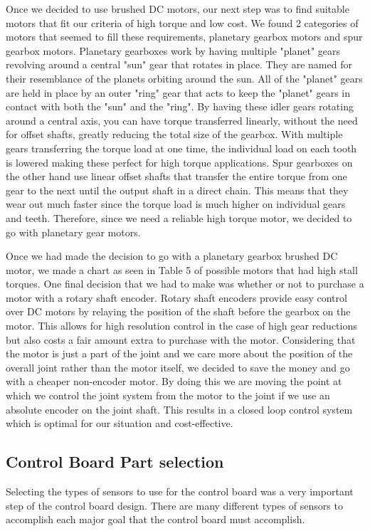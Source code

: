 \noindent Once we decided to use brushed DC motors, our next step was to find suitable motors that fit our criteria of high torque and low cost. We found 2 categories of motors that seemed to fill these requirements, planetary gearbox motors and spur gearbox motors. Planetary gearboxes work by having multiple "planet" gears revolving around a central "sun" gear that rotates in place. They are named for their resemblance of the planets orbiting around the sun. All of the "planet" gears are held in place by an outer "ring" gear that acts to keep the "planet" gears in contact with both the "sun" and the "ring". By having these idler gears rotating around a central axis, you can have torque transferred linearly, without the need for offset shafts, greatly reducing the total size of the gearbox. With multiple gears transferring the torque load at one time, the individual load on each tooth is lowered making these perfect for high torque applications. Spur gearboxes on the other hand use linear offset shafts that transfer the entire torque from one gear to the next until the output shaft in a direct chain.  This means that they wear out much faster since the torque load is much higher on individual gears and teeth.  Therefore, since we need a reliable high torque motor, we decided to go with planetary gear motors. 

\noindent Once we had made the decision to go with a planetary gearbox brushed DC motor, we made a chart as seen in Table 5 of possible motors that had high stall torques.  One final decision that we had to make was whether or not to purchase a motor with a rotary shaft encoder. Rotary shaft encoders provide easy control over DC motors by relaying the position of the shaft before the gearbox on the motor.  This allows for high resolution control in the case of high gear reductions but also costs a fair amount extra to purchase with the motor.  Considering that the motor is just a part of the joint and we care more about the position of the overall joint rather than the motor itself, we decided to save the money and go with a cheaper non-encoder motor.  By doing this we are moving the point at which we control the joint system from the motor to the joint if we use an absolute encoder on the joint shaft.  This results in a closed loop control system which is optimal for our situation and cost-effective.  

\subsection{Control Board Part selection}
Selecting the types of sensors to use for the control board was a very important step of the control board design. There are many different types of sensors to accomplish each major goal that the control board must accomplish.
